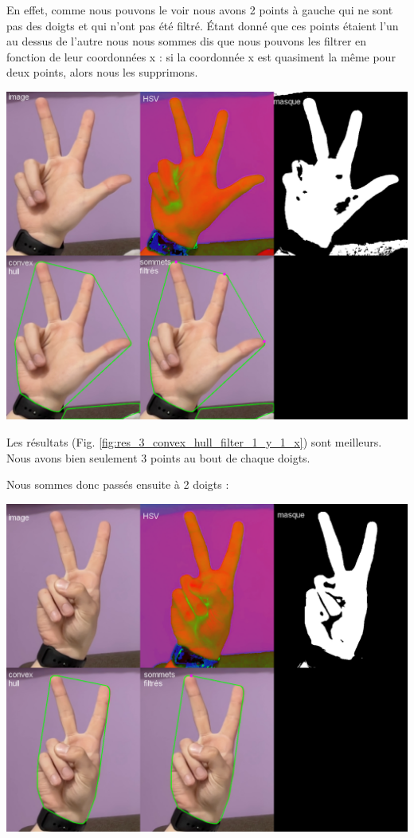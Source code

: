 \documentclass[11pt]{article}
\begin{document}
En effet, comme nous pouvons le voir nous avons 2 points à gauche qui ne sont pas des doigts et qui n'ont pas été filtré. \'Etant donné que ces points étaient l'un au dessus de l'autre nous nous sommes dis que nous pouvons les filtrer en fonction de leur coordonnées x : si la coordonnée x est quasiment la même pour deux points, alors nous les supprimons. \bigbreak

\begin{center}
    \includegraphics[width=\textwidth]{images/res_3_convex_hull_filter_1_y_1_x.png}
    \label{fig:res_3_convex_hull_filter_1_y_1_x}
\end{center}

Les résultats (Fig. \ref{fig:res_3_convex_hull_filter_1_y_1_x}) sont meilleurs. Nous avons bien seulement 3 points au bout de chaque doigts. \bigbreak

Nous sommes donc passés ensuite à 2 doigts :
\begin{center}
    \includegraphics[width=\textwidth]{images/res_2_convex_hull_filter_1_y_1_x.png}
    \label{fig:res_2_convex_hull_filter_1_y_1_x}
\end{center}
\end{document}
